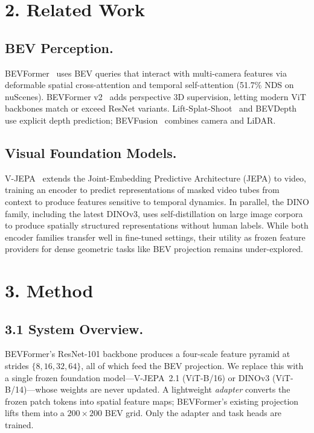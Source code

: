 \documentclass[12pt]{article}
\begin{document}
\section{2. Related Work}

\subsection{BEV Perception.}
BEVFormer~\cite{bevformer} uses BEV queries that interact with multi-camera features via deformable spatial cross-attention and temporal self-attention (51.7\% NDS on nuScenes). BEVFormer v2~\cite{bevformerv2} adds perspective 3D supervision, letting modern ViT backbones match or exceed ResNet variants. Lift-Splat-Shoot~\cite{lss} and BEVDepth use explicit depth prediction; BEVFusion~\cite{bevfusion} combines camera and LiDAR.

\subsection{Visual Foundation Models.}
V-JEPA~\cite{vjepa} extends the Joint-Embedding Predictive Architecture (JEPA) to video, training an encoder to predict representations of masked video tubes from context to produce features sensitive to temporal dynamics. In parallel, the DINO family, including the latest DINOv3, uses self-distillation on large image corpora to produce spatially structured representations without human labels. While both encoder families transfer well in fine-tuned settings, their utility as frozen feature providers for dense geometric tasks like BEV projection remains under-explored.

\section{3. Method}

\subsection{3.1 System Overview.}
BEVFormer's ResNet-101 backbone produces a four-scale feature pyramid at strides $\{8, 16, 32, 64\}$, all of which feed the BEV projection. We replace this with a single frozen foundation model---V-JEPA~2.1 (ViT-B/16) or DINOv3 (ViT-B/14)---whose weights are never updated. A lightweight \emph{adapter} converts the frozen patch tokens into spatial feature maps; BEVFormer's existing projection lifts them into a $200\!\times\!200$ BEV grid. Only the adapter and task heads are trained.
\end{document}
